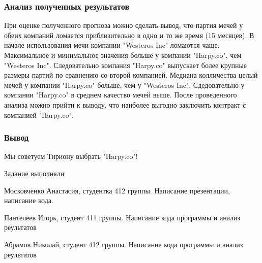 \documentclass[serif,mathserif]{beamer}
\begin{document}
\begin{frame}
    \frametitle{Анализ полученных результатов}
    При оценке полученного прогноза можно сделать вывод, что партия мечей у обеих компаний ломается приблизительно в одно и то же время (15 месяцев).
    В начале использования мечи компании "Westeros Inc" ломаются чаще.
    Максимальное и минимальное значения больше у компании "Harpy.co", чем "Westeros Inc". Следовательно компания "Harpy.co" выпускает более крупные размеры партий по сравнению со второй компанией. 
    Медиана колличества целый мечей у компании "Harpy.co" больше, чем у "Westeros Inc". Сдедовательно у компании "Harpy.co" в среднем качество мечей выше.
    После проведенного анализа можно прийти к выводу, что наиболее выгодно заключить контракт с компанией "Harpy.co". 

\end{frame}

\begin{frame}
    \frametitle{Вывод}
    
    \huge{Мы советуем Тириону выбрать "Harpy.co"!}
    
    
    
\end{frame}


\begin{frame}{Задание выполняли}
      \begin{itemize}
            {\small
            \item Московченко Анастасия, студентка 412 группы. Написание презентации, написание кода.
            \item Пантелеев Игорь, студент 411 группы. Написание кода программы и анализ реультатов
            \item Абрамов Николай, студент 412 группы. Написание кода программы и анализ реультатов}
            \end{itemize}
  \end{frame}
\end{document}

